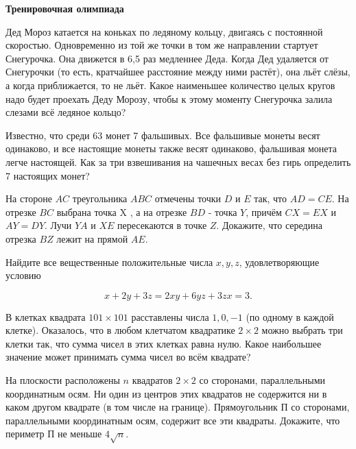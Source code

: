\centerline{\bf \Huge Тренировочная олимпиада}
\centerline{\bf \Huge }


Дед Мороз катается на коньках по ледяному кольцу, двигаясь с постоянной скоростью. Одновременно из той же точки в том же направлении стартует Снегурочка. Она движется в 6,5 раз медленнее Деда. Когда Дед удаляется от Снегурочки (то есть, кратчайшее расстояние между ними растёт), она льёт слёзы, а когда приближается, то не льёт. Какое наименьшее количество целых кругов надо будет проехать Деду Морозу, чтобы к этому моменту Снегурочка залила слезами всё ледяное кольцо?

Известно, что среди 63 монет 7 фальшивых. Все фальшивые монеты весят одинаково, и все настоящие монеты также весят одинаково, фальшивая монета легче настоящей. Как за три взвешивания на чашечных весах без гирь определить 7 настоящих монет?

На стороне $A C$ треугольника $A B C$ отмечены точки $D$ и $E$ так, что $A D=C E$. На отрезке $B C$ выбрана точка X , а на отрезке $B D$ - точка $Y$, причём $C X=E X$ и $A Y=D Y$. Лучи $Y A$ и $X E$ пересекаются в точке $Z$. Докажите, что середина отрезка $B Z$ лежит на прямой $A E$.

Найдите все вещественные положительные числа $x, y, z$, удовлетворяющие условию

$$
x+2 y+3 z=2 x y+6 y z+3 z x=3 .
$$


В клетках квадрата $101 \times 101$ расставлены числа $1,0,-1$ (по одному в каждой клетке). Оказалось, что в любом клетчатом квадратике $2 \times 2$ можно выбрать три клетки так, что сумма чисел в этих клетках равна нулю. Какое наибольшее значение может принимать сумма чисел во всём квадрате?

 На плоскости расположены $n$ квадратов $2 \times 2$ со сторонами, параллельными координатным осям. Ни один из центров этих квадратов не содержится ни в каком другом квадрате (в том числе на границе). Прямоугольник П со сторонами, параллельными координатным осям, содержит все эти квадраты. Докажите, что периметр П не меньше $4 \sqrt{n}$.